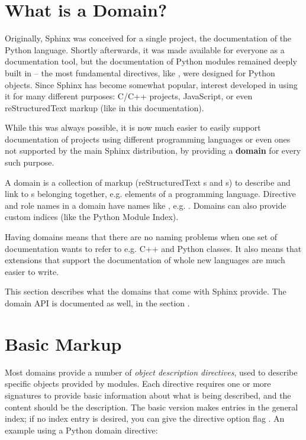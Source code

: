 \documentclass[letterpaper,10pt,english]{sphinxmanual}
\begin{document}
\section{What is a Domain?}
\label{domains:what-is-a-domain}
Originally, Sphinx was conceived for a single project, the documentation of the
Python language.  Shortly afterwards, it was made available for everyone as a
documentation tool, but the documentation of Python modules remained deeply
built in -- the most fundamental directives, like , were designed
for Python objects.  Since Sphinx has become somewhat popular, interest
developed in using it for many different purposes: C/C++ projects, JavaScript,
or even reStructuredText markup (like in this documentation).

While this was always possible, it is now much easier to easily support
documentation of projects using different programming languages or even ones not
supported by the main Sphinx distribution, by providing a \textbf{domain} for every
such purpose.

A domain is a collection of markup (reStructuredText {\hyperref[glossary:term\string-directive]{}}s and
{\hyperref[glossary:term\string-role]{}}s) to describe and link to {\hyperref[glossary:term\string-object]{}}s belonging together,
e.g. elements of a programming language.  Directive and role names in a domain
have names like , e.g. .  Domains can also provide
custom indices (like the Python Module Index).

Having domains means that there are no naming problems when one set of
documentation wants to refer to e.g. C++ and Python classes.  It also means that
extensions that support the documentation of whole new languages are much easier
to write.

This section describes what the domains that come with Sphinx provide.  The
domain API is documented as well, in the section {\hyperref[ext/appapi:domain\string-api]{}}.


\section{Basic Markup}
\label{domains:basic-domain-markup}\label{domains:basic-markup}
Most domains provide a number of \emph{object description directives}, used to
describe specific objects provided by modules.  Each directive requires one or
more signatures to provide basic information about what is being described, and
the content should be the description.  The basic version makes entries in the
general index; if no index entry is desired, you can give the directive option
flag .  An example using a Python domain directive:
\end{document}
